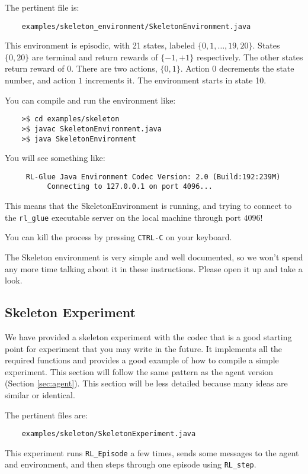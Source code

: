 \documentclass[11pt]{article}
\begin{document}
The pertinent file is:
\begin{verbatim}
	examples/skeleton_environment/SkeletonEnvironment.java
\end{verbatim}

This environment is episodic, with 21 states, labeled $\{0, 1,\ldots,19,20\}$. States $\{0, 20\}$ are terminal and return rewards of $\{-1, +1\}$ respectively.  The other states return reward of $0$.
There are two actions, $\{0, 1\}$.  Action $0$ decrements the state number, and action $1$ increments it. The environment starts in state 10.

You can compile and run the environment like:
\begin{verbatim}
	>$ cd examples/skeleton
	>$ javac SkeletonEnvironment.java
	>$ java SkeletonEnvironment
\end{verbatim}

You will see something like:
\begin{verbatim}
     RL-Glue Java Environment Codec Version: 2.0 (Build:192:239M)
          Connecting to 127.0.0.1 on port 4096...
\end{verbatim}

This means that the SkeletonEnvironment is running, and trying to connect to the \texttt{rl\_glue} executable server on the local machine through port $4096$! 

You can kill the process by pressing \texttt{CTRL-C} on your keyboard.


The Skeleton environment is very simple and well documented, so we won't spend any more time talking about it in these instructions.
Please open it up and take a look.

\subsection{Skeleton Experiment}
We have provided a skeleton experiment with the codec that is a good starting point for experiment that you may write in the future.
It implements all the required functions and provides a good example of how to compile a simple experiment.  This section will follow the same 
pattern as the agent version (Section \ref{sec:agent}).  This section will be less detailed because many ideas are similar or identical.

The pertinent files are:
\begin{verbatim}
	examples/skeleton/SkeletonExperiment.java
\end{verbatim}

This experiment runs \texttt{RL\_Episode} a few times, sends some messages to the agent and environment, and then steps through one episode using \texttt{RL\_step}.
\end{document}
